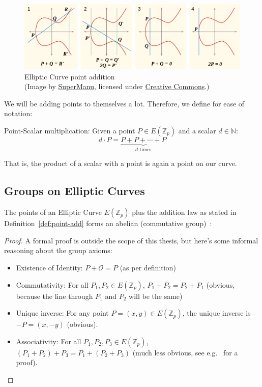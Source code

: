 \begin{figure}
    \includegraphics[width=\textwidth]{figures/ecc_point_addition.png}
    \caption[Elliptic Curve point addition]{Elliptic Curve point addition\\(Image by \href{https://commons.wikimedia.org/wiki/File:ECClines-2.svg}{SuperManu}, licensed under \href{https://creativecommons.org/licenses/by-sa/3.0/deed.en}{Creative Commons}.)}
    \label{fig:ecc-point-addition}
\end{figure}

We will be adding points to themselves a lot. Therefore, we define for ease of notation:
\begin{definition}
    Point-Scalar multiplication: Given a point $P \in E(\mathbb{Z}_p)$ and a scalar $d \in \mathbb{N}$: 
    \begin{equation}
        d \cdot P = \underbrace{P + P + \cdots + P}_{d \text{ times}}
    \end{equation}
\end{definition}
 
That is, the product of a scalar with a point is again a point on our curve.
\\

\subsection{Groups on Elliptic Curves}
\begin{theorem}
    The points of an Elliptic Curve $E(\mathbb{Z}_p)$ plus the addition law as stated in Definition~\ref{def:point-add} forms an abelian (commutative group)~\cite{katz_introduction_2015, washington_elliptic_2008}:
\end{theorem}
\begin{proof}
    A formal proof is outside the scope of this thesis, but here's some informal reasoning about the group axioms:
    \begin{itemize}
        \item Existence of Identity: $P + \mathcal{O} = P$ (as per definition)
        \item Commutativity: For all $P_1, P_2 \in E(\mathbb{Z}_p)$, $P_1 + P_2 = P_2 + P_1$ (obvious, because the line through $P_1$ and $P_2$ will be the same)
        \item Unique inverse: For any point $P = (x,y) \in E(\mathbb{Z}_p)$, the unique inverse is $-P = (x, -y)$ (obvious).
        \item Associativity: For all $P_1, P_2, P_3 \in E(\mathbb{Z}_p)$, $(P_1 + P_2) + P_3 = P_1 + (P_2 + P_3)$ (much less obvious, see e.g.~\cite[Chapter 2.4]{washington_elliptic_2008} for a proof).
    \end{itemize}
\end{proof}

